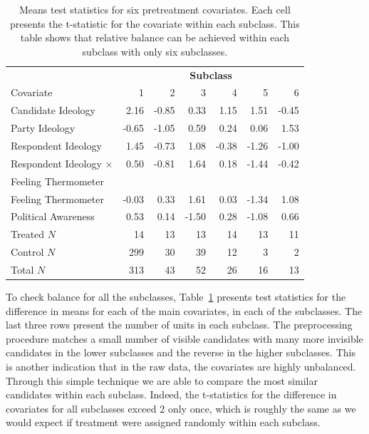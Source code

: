 \documentclass[11pt,titlepage]{article}
\newcommand{\MC}{\multicolumn}
\begin{document}
\begin{table}[t]
  \begin{center}
    \begin{tabular}{lrrrrrr}
      \hline
      & \MC{6}{c}{\bf Subclass} \\
      Covariate &  1 &  2 &  3 &  4 &  5 &  6 \\
      \hline
      Candidate Ideology & 2.16 & -0.85 & 0.33 & 1.15 & 1.51 & -0.45 \\
      Party Ideology & -0.65 & -1.05 & 0.59 & 0.24 & 0.06 & 1.53 \\
      Respondent Ideology & 1.45 & -0.73 & 1.08 & -0.38 & -1.26 & -1.00 \\
      Respondent Ideology $\times$ & 0.50 & -0.81 & 1.64 & 0.18 &
      -1.44 & -0.42 \\
      \hspace{0.1in} Feeling Thermometer \\
      Feeling Thermometer & -0.03 & 0.33 & 1.61 & 0.03 & -1.34 & 1.08 \\
      Political Awareness & 0.53 & 0.14 & -1.50 & 0.28 & -1.08 & 0.66
      \\ \hline
      Treated $N$& 14 & 13 & 13 & 14 & 13 & 11 \\
      Control $N$& 299 & 30 & 39 & 12 & 3 & 2 \\
      Total $N$  & 313 & 43 & 52 & 26 & 16 & 13 \\
      \hline
    \end{tabular}
    \caption{Means test statistics for six pretreatment covariates.
      Each cell presents the t-statistic for the covariate within each
      subclass.  This table shows that relative balance can be
      achieved within each subclass with only six subclasses.}
    \label{tb:kochxsub}
  \end{center}
\end{table}

To check balance for all the subclasses, Table~\ref{tb:kochxsub}
presents test statistics for the difference in means for each of the
main covariates, in each of the subclasses.  The last three rows
present the number of units in each subclass.  The preprocessing
procedure matches a small number of visible candidates with many more
invisible candidates in the lower subclasses and the reverse in the
higher subclasses.  This is another indication that in the raw data,
the covariates are highly unbalanced.  Through this simple technique
we are able to compare the most similar candidates within each
subclass.  Indeed, the t-statistics for the difference in covariates
for all subclasses exceed 2 only once, which is roughly the same as we
would expect if treatment were assigned randomly within each subclass.
\end{document}
